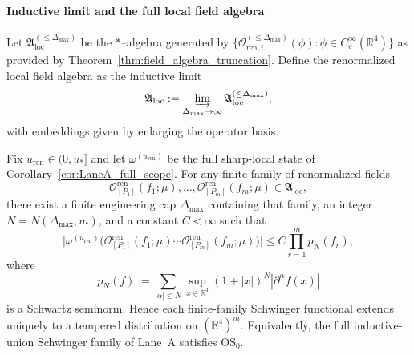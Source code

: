\paragraph*{Inductive limit and the full local field algebra}

\begin{definition}
\label{def:local_field_algebra}
Let $\mathfrak A_{\mathrm{loc}}^{(\le \Delta_{\max})}$ be the $*$--algebra generated by
\(\{\mathcal O^{(\le \Delta_{\max})}_{\mathrm{ren},i}(\phi):\phi\in C_c^{\infty}(\mathbb R^4)\}\)
as provided by Theorem~\ref{thm:field_algebra_truncation}.
Define the renormalized local field algebra as the inductive limit
\[
\mathfrak A_{\mathrm{loc}}:=\varinjlim_{\Delta_{\max}\to\infty}\mathfrak A_{\mathrm{loc}}^{(\le \Delta_{\max})},
\]
with embeddings given by enlarging the operator basis.
\end{definition}

\begin{theorem}\label{thm:LaneA_temperedness_verification}
Fix $u_{\mathrm{ren}}\in(0,u_\ast]$ and let $\omega^{(u_{\mathrm{ren}})}$ be the full sharp-local state of Corollary~\ref{cor:LaneA_full_scope}.
For any finite family of renormalized fields
\[
\mathcal O^{\mathrm{ren}}_{[P_1]}(f_1;\mu),\dots,\mathcal O^{\mathrm{ren}}_{[P_m]}(f_m;\mu)\in \mathfrak A_{\mathrm{loc}},
\]
there exist a finite engineering cap $\Delta_{\max}$ containing that family, an integer $N=N(\Delta_{\max},m)$, and a constant $C<\infty$ such that
\begin{equation}\label{eq:LaneA_temperedness_bound}
\Big|
\omega^{(u_{\mathrm{ren}})}\!\Big(
\mathcal O^{\mathrm{ren}}_{[P_1]}(f_1;\mu)\cdots \mathcal O^{\mathrm{ren}}_{[P_m]}(f_m;\mu)
\Big)
\Big|
\le C\prod_{r=1}^m p_N(f_r),
\end{equation}
where
\[
p_N(f):=\sum_{|\alpha|\le N}\sup_{x\in\mathbb R^4}(1+|x|)^N|\partial^\alpha f(x)|
\]
is a Schwartz seminorm.
Hence each finite-family Schwinger functional extends uniquely to a tempered distribution on $(\mathbb R^4)^m$.
Equivalently, the full inductive-union Schwinger family of Lane~A satisfies OS$_0$.
\end{theorem}

